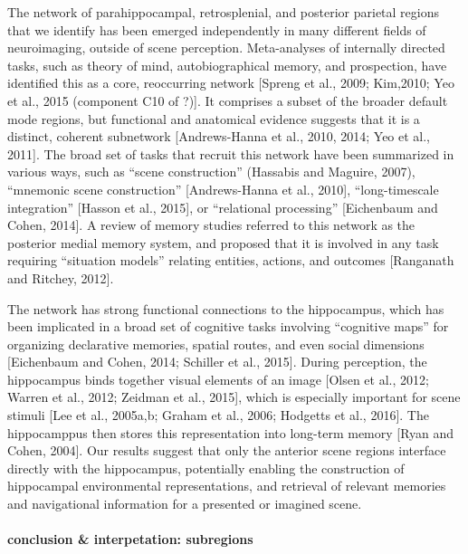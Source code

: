 \documentclass[english]{article}
\begin{document}
The network of parahippocampal, retrosplenial, and posterior parietal regions
that we identify has been emerged independently in many different fields of
neuroimaging, outside of scene perception.
%
Meta-analyses of internally directed tasks, such as theory of mind,
autobiographical memory, and prospection, have identified this as a core,
reoccurring network [Spreng et al., 2009; Kim,2010; Yeo et al., 2015 (component
C10 of ?)]. It comprises a subset of the broader default mode regions, but
functional and anatomical evidence suggests that it is a distinct, coherent
subnetwork [Andrews-Hanna et al., 2010, 2014; Yeo et al.,
2011]\citep{baldassano2016two}.
%
The broad set of tasks that recruit this network have been summarized in various
ways, such as ``scene construction'' (Hassabis and Maguire, 2007), ``mnemonic
scene construction'' [Andrews-Hanna et al., 2010], ``long-timescale
integration'' [Hasson et al., 2015], or ``relational processing'' [Eichenbaum
and Cohen, 2014].
%
A review of memory studies referred to this network as the posterior medial
memory system, and proposed that it is involved in any task requiring
``situation models'' relating entities, actions, and outcomes [Ranganath and
Ritchey, 2012]\citep{baldassano2016two}.

The network has strong functional connections to the hippocampus, which has been
implicated in a broad set of cognitive tasks involving ``cognitive maps'' for
organizing declarative memories, spatial routes, and even social dimensions
[Eichenbaum and Cohen, 2014; Schiller et al., 2015]. During perception, the
hippocampus binds together visual elements of an image [Olsen et al., 2012;
Warren et al., 2012; Zeidman et al., 2015], which is especially important for
scene stimuli [Lee et al., 2005a,b; Graham et al., 2006; Hodgetts et al., 2016].
The hippocamppus then stores this representation into long-term memory [Ryan and
Cohen, 2004]\citep{baldassano2016two}.
%
Our results suggest that only the anterior scene regions interface directly with
the hippocampus, potentially enabling the construction of hippocampal
environmental representations, and retrieval of relevant memories and
navigational information for a presented or imagined
scene\citep{baldassano2016two}.



\paragraph{conclusion \& interpetation: subregions}
\end{document}
